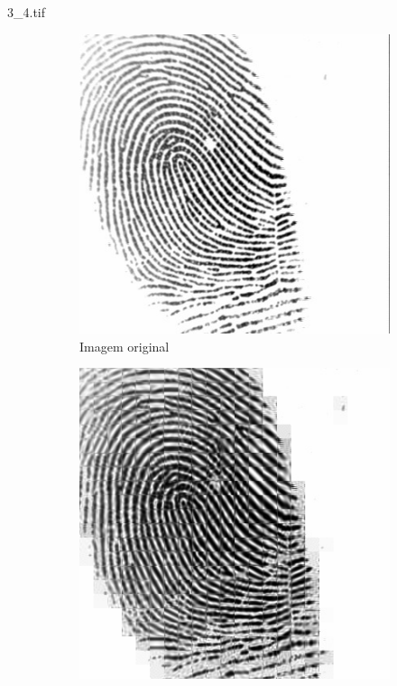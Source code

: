 \documentclass{beamer}
\begin{document}
    \begin{frame}{3\_4.tif}
        \begin{figure}
            \centering
            \begin{subfigure}[!ht]{0.32\textwidth}
                \includegraphics[width=\columnwidth]{Fingerprints/3_4.jpg}
                \caption{Imagem original}
            \end{subfigure}
            \begin{subfigure}[!ht]{0.32\textwidth}
                \includegraphics[width=\columnwidth]{Fingerprints/3_4_intermediate.jpg}

\end{subfigure}
\end{figure}
\end{frame}
\end{document}
